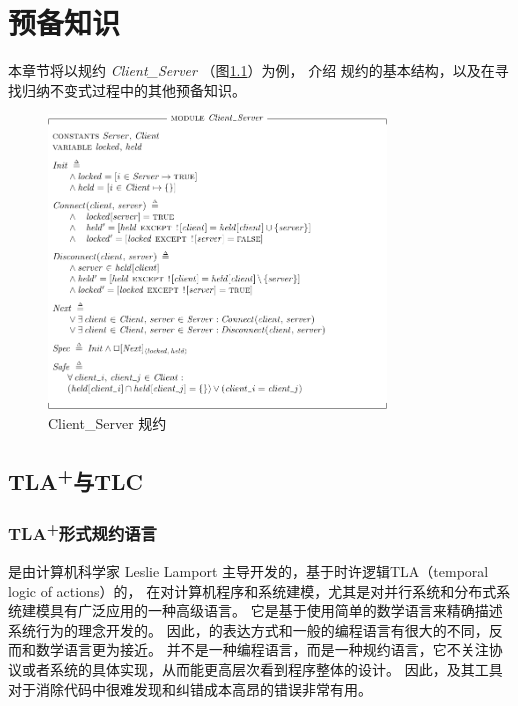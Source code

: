\chapter{预备知识}\label{chap:pre-knowleage}

本章节将以规约 \textit{Client\_Server} （图\ref{fig:client_server}）为例，
介绍 \TLA 规约的基本结构，以及在寻找归纳不变式过程中的其他预备知识。
\begin{figure}[h]
    \centering
    \includegraphics[width=0.8\textwidth]{figures/Client_Server.pdf}
    \caption{Client\_Server 规约}
    \label{fig:client_server}
\end{figure}

\section{\texorpdfstring{TLA\textsuperscript{+}与TLC}{TLA+与TLC}}
\subsection{\texorpdfstring{TLA\textsuperscript{+}形式规约语言}{TLA+形式规约语言}}
\href{https://lamport.azurewebsites.net/tla/tla.html}{\TLA} \cite{TLA+}是由计算机科学家 Leslie Lamport 主导开发的，基于时许逻辑TLA（temporal logic of actions）\cite{temporal}的，
在对计算机程序和系统建模，尤其是对并行系统和分布式系统建模具有广泛应用\cite{PaxosStore}的一种高级语言。
它是基于使用简单的数学语言来精确描述系统行为的理念开发的。
因此，\TLA 的表达方式和一般的编程语言有很大的不同，反而和数学语言更为接近。
\TLA 并不是一种编程语言，而是一种规约语言，它不关注协议或者系统的具体实现，从而能更高层次看到程序整体的设计。
因此，\TLA 及其工具对于消除代码中很难发现和纠错成本高昂的错误非常有用。

